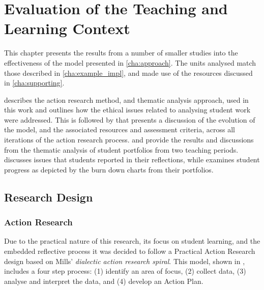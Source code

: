 
\chapter{Evaluation of the Teaching and Learning Context} %
\label{cha:evaluation}

\graphicspath{{Figures/Evaluation/}}

This chapter presents the results from a number of smaller studies into the effectiveness of the model presented in \cref{cha:approach}. The units analysed match those described in \cref{cha:example_impl}, and made use of the resources discussed in \cref{cha:supporting}. 

 describes the action research method, and thematic analysis approach, used in this work and outlines how the ethical issues related to analysing student work were addressed. This is followed by  that presents a discussion of the evolution of the model, and the associated resources and assessment criteria, across all iterations of the action research process.  and  provide the results and discussions from the thematic analysis of student portfolios from two teaching periods.  discusses issues that students reported in their reflections, while  examines student progress as depicted by the burn down charts from their portfolios. 

\section{Research Design} %
\label{sec:research_design}

\subsection{Action Research} %
\label{sub:action_research}

Due to the practical nature of this research, its focus on student learning, and the embedded reflective process it was decided to follow a Practical Action Research \cite{Creswell:2008} design based on Mills' \cite{Mills:2010} \emph{dialectic action research spiral}. This model, shown in , includes a four step process: (1) identify an area of focus, (2) collect data, (3) analyse and interpret the data, and (4) develop an Action Plan. %

